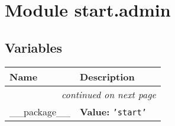 %
%
%


\section{Module start.admin}

    \label{start:admin}


  \subsection{Variables}

    \vspace{-1cm}
\hspace{\varindent}\begin{longtable}{|p{\varnamewidth}|p{\vardescrwidth}|l}
\cline{1-2}
\cline{1-2} \centering \textbf{Name} & \centering \textbf{Description}& \\
\cline{1-2}
\endhead\cline{1-2}\multicolumn{3}{r}{\small\textit{continued on next page}}\\\endfoot\cline{1-2}
\endlastfoot\raggedright \_\-\_\-p\-a\-c\-k\-a\-g\-e\-\_\-\_\- & \raggedright \textbf{Value:} 
{\tt \texttt{'}\texttt{start}\texttt{'}}&\\
\cline{1-2}
\end{longtable}

